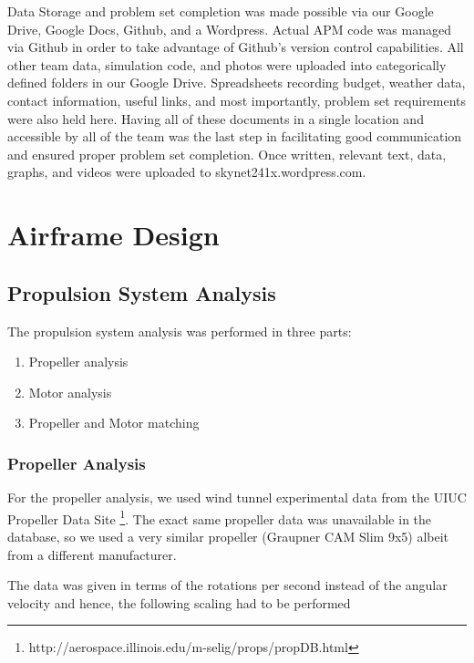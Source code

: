 \documentclass[11pt]{article}
\begin{document}
		Data Storage and problem set completion was made possible via our Google Drive, Google Docs, Github, and a Wordpress. Actual APM code was managed via Github in order to take advantage of Github's version control capabilities. All other team data, simulation code, and photos were uploaded into categorically defined folders in our Google Drive. Spreadsheets recording budget, weather data, contact information, useful links, and most importantly, problem set requirements were also held here. Having all of these documents in a single location and accessible by all of the team was the last step in facilitating good communication and ensured proper problem set completion. Once written, relevant text, data, graphs, and videos were uploaded to skynet241x.wordpress.com.

		
		\label{Mission}

		\section{Airframe Design}
			\label{Vehicle}

			\subsection{Propulsion System Analysis}

			The propulsion system analysis was performed in three parts:
			\begin{enumerate}
				\item Propeller analysis
				\item Motor analysis
				\item Propeller and Motor matching
			\end{enumerate}

			\subsubsection{Propeller Analysis}

			For the propeller analysis, we used wind tunnel experimental data from the UIUC Propeller Data Site \footnote{http://aerospace.illinois.edu/m-selig/props/propDB.html}. The exact same propeller data was unavailable in the database, so we used a very similar propeller (Graupner CAM Slim 9x5) albeit from a different manufacturer.

			The data was given in terms of the rotations per second instead of the angular velocity and hence, the following scaling had to be performed
\end{document}
